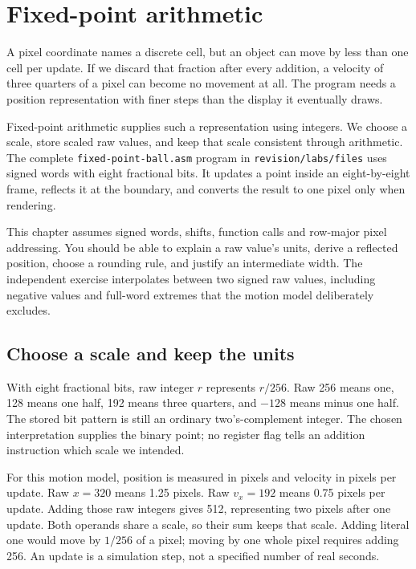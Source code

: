 \chapter{Fixed-point arithmetic}
\label{revision:fixed-point}

A pixel coordinate names a discrete cell, but an object can move by less than one
cell per update. If we discard that fraction after every addition, a velocity of
three quarters of a pixel can become no movement at all. The program needs a
position representation with finer steps than the display it eventually draws.

Fixed-point arithmetic supplies such a representation using integers. We choose
a scale, store scaled raw values, and keep that scale consistent through arithmetic.
The complete \texttt{fixed-point-ball.asm} program in \texttt{revision/labs/files}
uses signed words with eight fractional bits. It updates a point inside an
eight-by-eight frame, reflects it at the boundary, and converts the result to
one pixel only when rendering.

This chapter assumes signed words, shifts, function calls and row-major pixel
addressing. You should be able to explain a raw value's units, derive a reflected
position, choose a rounding rule, and justify an intermediate width. The independent
exercise interpolates between two signed raw values, including negative values
and full-word extremes that the motion model deliberately excludes.

\section{Choose a scale and keep the units}

With eight fractional bits, raw integer $r$ represents $r/256$. Raw 256 means one,
128 means one half, 192 means three quarters, and $-128$ means minus one half.
The stored bit pattern is still an ordinary two's-complement integer. The chosen
interpretation supplies the binary point; no register flag tells an addition
instruction which scale we intended.

For this motion model, position is measured in pixels and velocity in pixels per
update. Raw $x=320$ means 1.25 pixels. Raw $v_x=192$ means 0.75 pixels per update.
Adding those raw integers gives 512, representing two pixels after one update.
Both operands share a scale, so their sum keeps that scale. Adding literal one
would move by $1/256$ of a pixel; moving by one whole pixel requires adding 256.
An update is a simulation step, not a specified number of real seconds.

